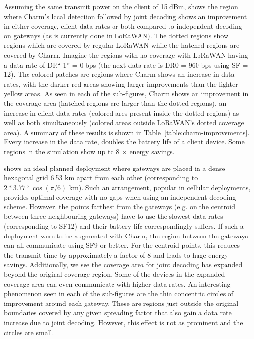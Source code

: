 Assuming the same transmit power on the client of 15 dBm,
 shows the region where Charm's local detection
followed by joint decoding shows an improvement in either coverage, client
data rates or both compared to independent decoding on gateways (as is
currently done in LoRaWAN). 
The dotted regions show regions which are covered by regular LoRaWAN while the
hatched regions are covered by Charm. Imagine the regions with no coverage
with LoRaWAN having a data rate of DR``-1'' = 0 bps (the next data rate is DR0
= 960 bps using SF = 12). The colored patches are regions where Charm shows an
increase in data rates, with the darker red areas showing larger improvements
than the lighter yellow areas. As seen in each of the sub-figures, Charm shows
an improvement in the coverage area (hatched regions are larger than the
dotted regions), an increase in client data rates (colored ares present inside
the dotted regions) as well as both simultaneously (colored areas outside
LoRaWAN's dotted coverage area). A summary of these results is shown in
Table~\ref{table:charm-improvements}. Every increase in the data rate, doubles
the battery life of a client device. Some regions in the simulation show up to
8 $\times$ energy savings.

 shows an ideal planned deployment where gateways
are placed in a dense hexagonal grid 6.53 km apart from each other
(corresponding to $2*3.77*\cos(\pi/6)$ km). Such an arrangement, popular in
cellular deployments, provides optimal coverage with no gaps when using an
independent decoding scheme. However, the points farthest from the gateways
(e.g. on the centroid between three neighbouring gateways) have to use the
slowest data rates (corresponding to SF12) and their battery life
correspondingly suffers. If such a deployment were to be augmented with Charm,
the region between the gateways can all communicate using SF9 or better. For
the centroid points, this reduces the transmit time by approximately a factor
of 8 and leads to huge energy savings. Additionally, we see the coverage area
for joint decoding has expanded beyond the original coverage region. Some of
the devices in the expanded coverage area can even communicate with higher
data rates.
An interesting phenomenon seen in each of the sub-figures are the
thin concentric circles of improvement around each gateway. These are regions
just outside the original boundaries covered by any given spreading factor
that also gain a data rate increase due to joint decoding. However, this
effect is not as prominent and the circles are small.

